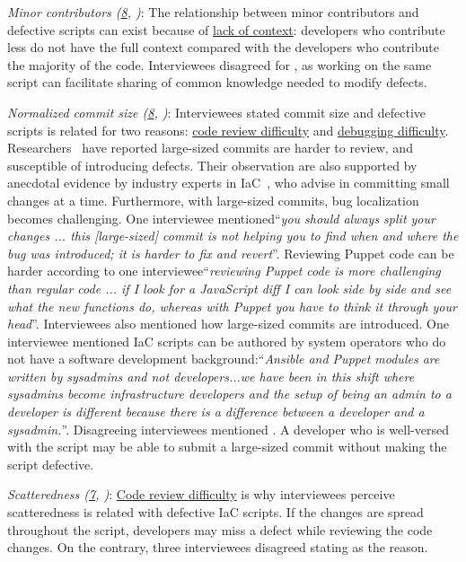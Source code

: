 \documentclass[smallextended]{svjour3}       %
\begin{document}
\textit{Minor contributors (\ul{8}, )}: The relationship between minor contributors and defective scripts can exist because of \ul{lack of context}: developers who contribute less do not have the full context compared with the developers who contribute the majority of the code. Interviewees disagreed for , as working on the same script can facilitate sharing of common knowledge needed to modify defects.  

\textit{Normalized commit size (\ul{8}, )}: Interviewees stated commit size and defective scripts is related for two reasons: \ul{code review difficulty} and \ul{debugging difficulty}. Researchers~\citep{storey:codereview:2018} have reported large-sized commits are harder to review, and susceptible of introducing defects. Their observation are also supported by anecdotal evidence by industry experts in IaC~\citep{kief:iac:book}, who advise in committing small changes at a time. Furthermore, with large-sized commits, bug localization becomes challenging. One interviewee mentioned``\textit{you should always split your changes ... this [large-sized] commit is not helping you to find when and where the bug was introduced; it is harder to fix and revert}''. Reviewing Puppet code can be harder according to one interviewee``\textit{reviewing Puppet code is more challenging than regular code ... if I look for a JavaScript diff I can look side by side and see what the new functions do, whereas with Puppet you have to think it through your head}''. Interviewees also mentioned how large-sized commits are introduced. One interviewee mentioned IaC scripts can be authored by system operators who do not have a software development background:``\textit{Ansible and Puppet modules are written by sysadmins and not developers...we have been in this shift where sysadmins become infrastructure developers and the setup of being an admin to a developer is different because there is a difference between a developer and a sysadmin.}''. Disagreeing interviewees mentioned . A developer who is well-versed with the script may be able to submit a large-sized commit without making the script defective. 

\textit{Scatteredness (\ul{7}, )}: \ul{Code review difficulty} is why interviewees perceive scatteredness is related with defective IaC scripts. If the changes are spread throughout the script, developers may miss a defect while reviewing the code changes. On the contrary, three interviewees disagreed stating  as the reason. 
\end{document}
